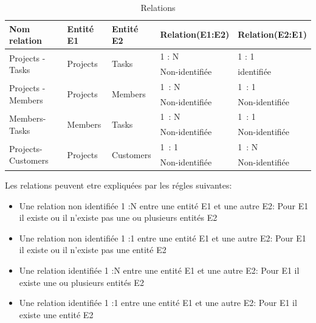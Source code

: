 \begin{table}

\begin{tabular}{|l|l|l|l|l|}
\hline
Nom relation                        & Entité E1                 & Entité E2                  & Relation(E1:E2) & Relation(E2:E1)  \\
\hline
\multirow{2}{*}{Projects -Tasks}    & \multirow{2}{*}{Projects} & \multirow{2}{*}{Tasks}     & 1 : N           & 1 : 1            \\
\cline{4-5}
                                    &                           &                            & Non-identifiée  & identifiée       \\
\hline
\multirow{2}{*}{Projects -Members}  & \multirow{2}{*}{Projects} & \multirow{2}{*}{Members}   & 1~: N           & 1~: 1            \\
\cline{4-5}
                                    &                           &                            & Non-identifiée  & Non-identifiée   \\
\hline
\multirow{2}{*}{Members-Tasks}      & \multirow{2}{*}{Members}  & \multirow{2}{*}{Tasks}     & 1~: N           & 1~: 1            \\
\cline{4-5}
                                    &                           &                            & Non-identifiée  & Non-identifiée   \\
\hline
\multirow{2}{*}{Projects-Customers} & \multirow{2}{*}{Projects} & \multirow{2}{*}{Customers} & 1~: 1           & 1~: N            \\
\cline{4-5}
                                    &                           &                            & Non-identifiée  & Non-identifiée   \\
\hline
\end{tabular}
\centering
\caption {Relations}
\end{table}
\FloatBarrier

Les relations peuvent etre expliqu\'{e}es par les r\'{e}gles suivantes:
\begin{itemize}
\item{ Une relation non identifi\'{e}e 1 :N  entre une entit\'{e} E1 et une autre E2:}
Pour E1 il existe ou il n'existe pas une ou plusieurs entit\'{e}s E2
\bigskip

\item{Une relation non identifi\'{e}e 1 :1 entre une entit\'{e} E1 et une autre E2:}
Pour E1 il existe ou il n'existe pas une entit\'{e} E2
\bigskip

\item{Une relation identifi\'{e}e 1 :N entre une entit\'{e} E1 et une autre E2: }
 Pour E1 il existe une ou plusieurs entit\'{e}s E2
 \bigskip

\item{Une relation identifi\'{e}e 1 :1 entre une entit\'{e} E1 et une autre E2: }
 Pour E1 il existe une entit\'{e} E2
 \bigskip

\end{itemize}

